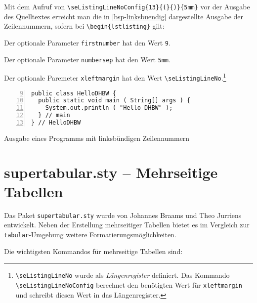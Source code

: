 Mit dem Aufruf von \verb+\seListingLineNoConfig{13}{(}{)}{5mm}+ vor der Ausgabe des Quelltextes erreicht man die in \vref{bsp-linksbuendig} 
dargestellte Ausgabe der Zeilennummern, sofern bei \verb+\begin{lstlisting}+ gilt:

\begin{seList}
\item Der optionale Parameter \verb+firstnumber+ hat den Wert \verb+9+.
\item Der optionale Parameter \verb+numbersep+ hat den Wert \verb+5mm+.
\item Der optionale Paremeter \verb+xleftmargin+ hat den Wert \verb+\seListingLineNo+.\footnote{\texttt{\textbackslash{}seListingLineNo} wurde als 
\textsl{L\"angenregister} definiert. Das Kommando \texttt{\textbackslash{}se\-Lis\-ting\-Line\-No\-Con\-fig} berechnet den ben\"otigten Wert f\"ur \texttt{xleftmargin} und schreibt diesen 
Wert in das L\"angenregister.}
\end{seList}

\clearpage


\begin{programm}[htbp]
\begin{lstlisting}[numbers=left,firstnumber=9,numbersep=5mm,xleftmargin=\seListingLineNo]
public class HelloDHBW {
  public static void main ( String[] args ) {
    System.out.println ( "Hello DHBW" );
  } // main
} // HelloDHBW
\end{lstlisting}
\caption{Ausgabe eines Programms mit linksb\"undigen Zeilennummern\label{bsp-linksbuendig}}
\end{programm}


\section{supertabular.sty -- Mehrseitige Tabellen}

Das Paket \texttt{supertabular.sty} wurde von Johannes Braams und Theo Jurriens entwickelt.
Neben der Erstellung mehrseitiger Tabellen bietet es im Vergleich zur \texttt{tabular}-Umgebung weitere Formatierungsm\"oglichkeiten.

Die wichtigsten Kommandos f\"ur mehrseitige Tabellen sind:

